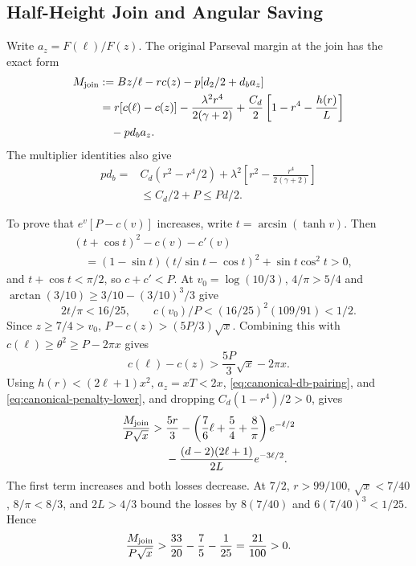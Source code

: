 \subsection{Half-Height Join and Angular Saving}
\label{app:joining-height}\label{app:manual-join-direct}

Write \(a_z=F(\ell)/F(z)\). The original Parseval margin at the
join has the exact form
\begin{align*}
 M_{\rm join}
 &:={Bz}/{\ell}-r c(z)-p[d_2/2+d_ba_z]\\
 &=r[c(\ell)-c(z)]-\frac{\lambda^2r^4}{2(\gamma+2)}
   +\frac{C_d}{2}\left[1-r^4-\frac{h(r)}L\right]\\
 &\quad-p d_ba_z.
\end{align*}
The multiplier identities also give
\begin{equation}
 \begin{split}
 p d_b={}&C_d(r^2-r^4/2)
       +\lambda^2\left[r^2-\frac{r^4}{2(\gamma+2)}\right]\\
       &\le C_d/2+P\le Pd/2.
 \end{split}
 \label{eq:canonical-db-pairing}
\end{equation}

To prove that \(e^v[P-c(v)]\) increases, write
\(t=\arcsin(\tanh v)\). Then
\begin{align*}
 &(t+\cos t)^2-c(v)-c'(v)\\
 &\quad=(1-\sin t)(t/\sin t-\cos t)^2
 +\sin t\cos^2t>0,
\end{align*}
and \(t+\cos t<\pi/2\), so \(c+c'<P\).
At \(v_0=\log(10/3)\), \(4/\pi>5/4\) and
\(\arctan(3/10)\ge3/10-(3/10)^3/3\) give
\[
 2t/\pi<16/25,\qquad
 c(v_0)/P<(16/25)^2(109/91)<1/2.
\]
Since \(z\ge7/4>v_0\), \(P-c(z)>(5P/3)\sqrt x\).
Combining this with
\(c(\ell)\ge\theta^2\ge P-2\pi x\) gives
\[
                 c(\ell)-c(z)>\frac{5P}{3}\sqrt x-2\pi x.
\]
Using \(h(r)<(2\ell+1)x^2\), \(a_z=xT<2x\),
\eqref{eq:canonical-db-pairing}, and
\eqref{eq:canonical-penalty-lower}, and dropping
\(C_d(1-r^4)/2>0\), gives
\begin{align*}
 \frac{M_{\rm join}}{P\sqrt x}
 >{}&\frac{5r}{3}
 -\left(\frac76\ell+\frac54+\frac8\pi\right)e^{-\ell/2}\\
 &-\frac{(d-2)(2\ell+1)}{2L}e^{-3\ell/2}.
\end{align*}
The first term increases and both losses decrease. At \(7/2\),
\(r>99/100\), \(\sqrt x<7/40\), \(8/\pi<8/3\), and
\(2L>4/3\) bound the losses by \(8(7/40)\) and
\(6(7/40)^3<1/25\). Hence
\[
             \frac{M_{\rm join}}{P\sqrt x}
                  >\frac{33}{20}-\frac75-\frac1{25}
                   =\frac{21}{100}>0.
\]


